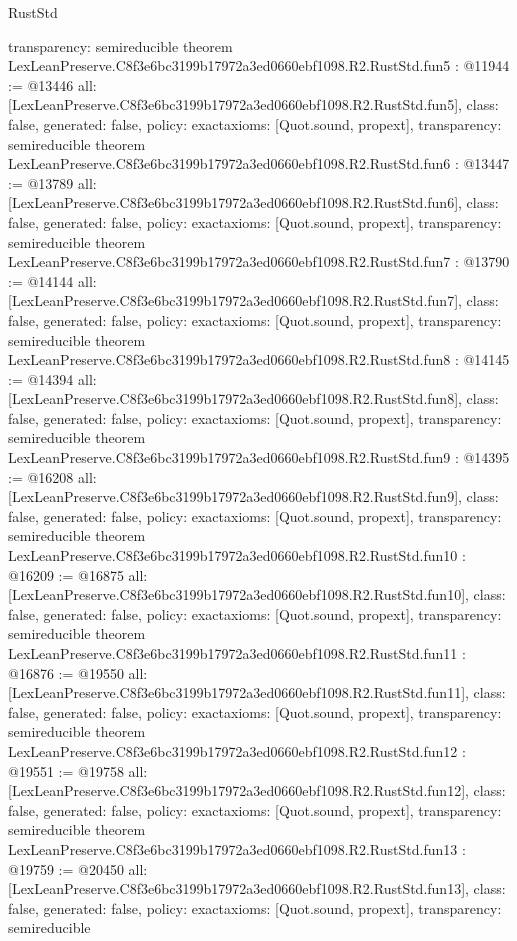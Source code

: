 \begin{lexlean}{RustStd}
\begin{coremodule}
{  transparency: semireducible
}
theorem LexLeanPreserve.C8f3e6bc3199b17972a3ed0660ebf1098.R2.RustStd.fun5 : @11944 := @13446 {
  all: [LexLeanPreserve.C8f3e6bc3199b17972a3ed0660ebf1098.R2.RustStd.fun5],
  class: false,
  generated: false,
  policy: exact{axioms: [Quot.sound, propext]},
  transparency: semireducible
}
theorem LexLeanPreserve.C8f3e6bc3199b17972a3ed0660ebf1098.R2.RustStd.fun6 : @13447 := @13789 {
  all: [LexLeanPreserve.C8f3e6bc3199b17972a3ed0660ebf1098.R2.RustStd.fun6],
  class: false,
  generated: false,
  policy: exact{axioms: [Quot.sound, propext]},
  transparency: semireducible
}
theorem LexLeanPreserve.C8f3e6bc3199b17972a3ed0660ebf1098.R2.RustStd.fun7 : @13790 := @14144 {
  all: [LexLeanPreserve.C8f3e6bc3199b17972a3ed0660ebf1098.R2.RustStd.fun7],
  class: false,
  generated: false,
  policy: exact{axioms: [Quot.sound, propext]},
  transparency: semireducible
}
theorem LexLeanPreserve.C8f3e6bc3199b17972a3ed0660ebf1098.R2.RustStd.fun8 : @14145 := @14394 {
  all: [LexLeanPreserve.C8f3e6bc3199b17972a3ed0660ebf1098.R2.RustStd.fun8],
  class: false,
  generated: false,
  policy: exact{axioms: [Quot.sound, propext]},
  transparency: semireducible
}
theorem LexLeanPreserve.C8f3e6bc3199b17972a3ed0660ebf1098.R2.RustStd.fun9 : @14395 := @16208 {
  all: [LexLeanPreserve.C8f3e6bc3199b17972a3ed0660ebf1098.R2.RustStd.fun9],
  class: false,
  generated: false,
  policy: exact{axioms: [Quot.sound, propext]},
  transparency: semireducible
}
theorem LexLeanPreserve.C8f3e6bc3199b17972a3ed0660ebf1098.R2.RustStd.fun10 : @16209 := @16875 {
  all: [LexLeanPreserve.C8f3e6bc3199b17972a3ed0660ebf1098.R2.RustStd.fun10],
  class: false,
  generated: false,
  policy: exact{axioms: [Quot.sound, propext]},
  transparency: semireducible
}
theorem LexLeanPreserve.C8f3e6bc3199b17972a3ed0660ebf1098.R2.RustStd.fun11 : @16876 := @19550 {
  all: [LexLeanPreserve.C8f3e6bc3199b17972a3ed0660ebf1098.R2.RustStd.fun11],
  class: false,
  generated: false,
  policy: exact{axioms: [Quot.sound, propext]},
  transparency: semireducible
}
theorem LexLeanPreserve.C8f3e6bc3199b17972a3ed0660ebf1098.R2.RustStd.fun12 : @19551 := @19758 {
  all: [LexLeanPreserve.C8f3e6bc3199b17972a3ed0660ebf1098.R2.RustStd.fun12],
  class: false,
  generated: false,
  policy: exact{axioms: [Quot.sound, propext]},
  transparency: semireducible
}
theorem LexLeanPreserve.C8f3e6bc3199b17972a3ed0660ebf1098.R2.RustStd.fun13 : @19759 := @20450 {
  all: [LexLeanPreserve.C8f3e6bc3199b17972a3ed0660ebf1098.R2.RustStd.fun13],
  class: false,
  generated: false,
  policy: exact{axioms: [Quot.sound, propext]},
  transparency: semireducible
}
\end{coremodule}
\end{lexlean}
